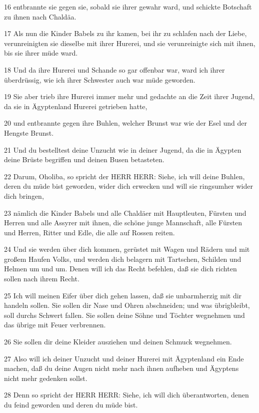 \par 16 entbrannte sie gegen sie, sobald sie ihrer gewahr ward, und schickte Botschaft zu ihnen nach Chaldäa.
\par 17 Als nun die Kinder Babels zu ihr kamen, bei ihr zu schlafen nach der Liebe, verunreinigten sie dieselbe mit ihrer Hurerei, und sie verunreinigte sich mit ihnen, bis sie ihrer müde ward.
\par 18 Und da ihre Hurerei und Schande so gar offenbar war, ward ich ihrer überdrüssig, wie ich ihrer Schwester auch war müde geworden.
\par 19 Sie aber trieb ihre Hurerei immer mehr und gedachte an die Zeit ihrer Jugend, da sie in Ägyptenland Hurerei getrieben hatte,
\par 20 und entbrannte gegen ihre Buhlen, welcher Brunst war wie der Esel und der Hengste Brunst.
\par 21 Und du bestelltest deine Unzucht wie in deiner Jugend, da die in Ägypten deine Brüste begriffen und deinen Busen betasteten.
\par 22 Darum, Oholiba, so spricht der HERR HERR: Siehe, ich will deine Buhlen, deren du müde bist geworden, wider dich erwecken und will sie ringsumher wider dich bringen,
\par 23 nämlich die Kinder Babels und alle Chaldäer mit Hauptleuten, Fürsten und Herren und alle Assyrer mit ihnen, die schöne junge Mannschaft, alle Fürsten und Herren, Ritter und Edle, die alle auf Rossen reiten.
\par 24 Und sie werden über dich kommen, gerüstet mit Wagen und Rädern und mit großem Haufen Volks, und werden dich belagern mit Tartschen, Schilden und Helmen um und um. Denen will ich das Recht befehlen, daß sie dich richten sollen nach ihrem Recht.
\par 25 Ich will meinen Eifer über dich gehen lassen, daß sie unbarmherzig mit dir handeln sollen. Sie sollen dir Nase und Ohren abschneiden; und was übrigbleibt, soll durchs Schwert fallen. Sie sollen deine Söhne und Töchter wegnehmen und das übrige mit Feuer verbrennen.
\par 26 Sie sollen dir deine Kleider ausziehen und deinen Schmuck wegnehmen.
\par 27 Also will ich deiner Unzucht und deiner Hurerei mit Ägyptenland ein Ende machen, daß du deine Augen nicht mehr nach ihnen aufheben und Ägyptens nicht mehr gedenken sollst.
\par 28 Denn so spricht der HERR HERR: Siehe, ich will dich überantworten, denen du feind geworden und deren du müde bist.
